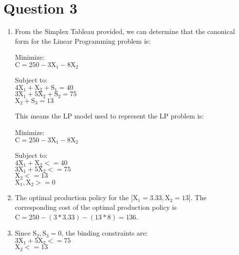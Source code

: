 \section*{Question 3}
\begin{enumerate}

\item
From the Simplex Tableau provided, we can determine that the canonical form for the Linear Programming problem is:

Minimize: \\
$\text{C} = 250 - 3\text{X}_1 - 8\text{X}_2$

Subject to: \\
$4\text{X}_1 + \text{X}_2 + \text{S}_1 = 40$ \\
$3\text{X}_1 + 5\text{X}_2 + \text{S}_2 = 75$ \\
$\text{X}_2 + \text{S}_3 = 13$

This means the LP model used to represent the LP problem is:

Minimize: \\
$\text{C} = 250 - 3\text{X}_1 - 8\text{X}_2$

Subject to: \\
	$4\text{X}_1 + \text{X}_2 <= 40$ \\
	$3\text{X}_1 + 5\text{X}_2 <= 75$ \\
	$\text{X}_2 <= 13$ \\
	$\text{X}_1, \text{X}_2 >= 0$

	
\item
The optimal production policy for the [$\text{X}_1 = 3.33, \text{X}_2 = 13$]. The corresponding cost of the optimal production policy is $\text{C} = 250 - (3*3.33) - (13*8) = 136$.

\item
Since $\text{S}_2, \text{S}_3 = 0$, the binding constraints are:\\
$3\text{X}_1 + 5\text{X}_2 <= 75$ \\
$\text{X}_2 <= 13$ \\

\end{enumerate}